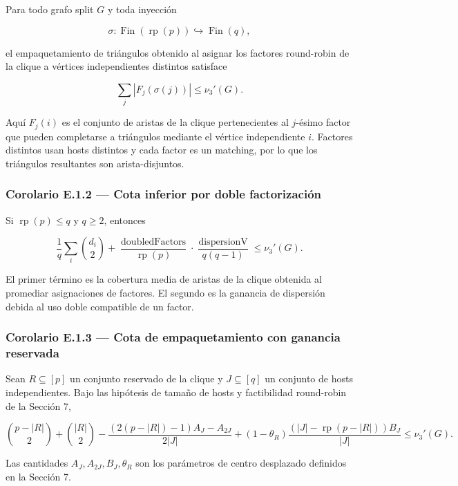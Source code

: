 \documentclass[spanish,11pt,a4paper]{article}
\begin{document}
Para todo grafo split \(G\) y toda inyección

\[\sigma:\operatorname{Fin}(\operatorname{rp}(p))\hookrightarrow \operatorname{Fin}(q),\]

el empaquetamiento de triángulos obtenido al asignar los factores
round-robin de la clique a vértices independientes distintos satisface

\[\sum_j |F_j(\sigma(j))|\le \nu_3'(G).\]

Aquí \(F_j(i)\) es el conjunto de aristas de la clique pertenecientes al
\(j\)-ésimo factor que pueden completarse a triángulos mediante el
vértice independiente \(i\). Factores distintos usan hosts distintos y
cada factor es un matching, por lo que los triángulos resultantes son
arista-disjuntos.

\subsubsection{Corolario E.1.2 --- Cota inferior por doble
factorización}\label{corolario-e.1.2-cota-inferior-por-doble-factorizaciuxf3n}

Si \(\operatorname{rp}(p)\le q\) y \(q\ge2\), entonces

\[\frac1q\sum_i \binom{d_i}{2}+\frac{\operatorname{doubledFactors}}{\operatorname{rp}(p)}\cdot\frac{\operatorname{dispersionV}}{q(q-1)}\le \nu_3'(G).\]

El primer término es la cobertura media de aristas de la clique obtenida
al promediar asignaciones de factores. El segundo es la ganancia de
dispersión debida al uso doble compatible de un factor.

\subsubsection{Corolario E.1.3 --- Cota de empaquetamiento con ganancia
reservada}\label{corolario-e.1.3-cota-de-empaquetamiento-con-ganancia-reservada}

Sean \(R\subseteq[p]\) un conjunto reservado de la clique y
\(J\subseteq[q]\) un conjunto de hosts independientes. Bajo las
hipótesis de tamaño de hosts y factibilidad round-robin de la Sección 7,

\[\binom{p-|R|}{2}+\binom{|R|}{2}-\frac{(2(p-|R|)-1)A_J-A_{2J}}{2|J|}+(1-\theta_R)\frac{(|J|-\operatorname{rp}(p-|R|))B_J}{|J|}\le \nu_3'(G).\]

Las cantidades \(A_J,A_{2J},B_J,\theta_R\) son los parámetros de centro
desplazado definidos en la Sección 7.
\end{document}
